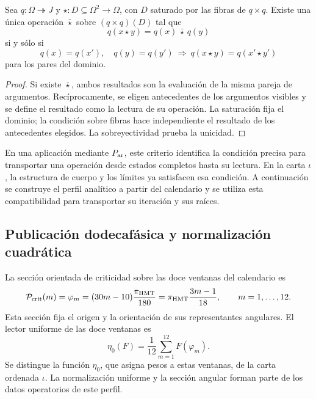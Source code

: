 \begin{proposition}
\label{hmtfg:criterio-descenso}
Sea \(q:\Omega\twoheadrightarrow J\) y
\(\star:D\subseteq\Omega^2\to\Omega\), con \(D\) saturado por las
fibras de \(q\times q\). Existe una única operación \(\bar\star\)
sobre \((q\times q)(D)\) tal que
\[
 q(x\star y)=q(x)\,\bar\star\,q(y)
\]
si y sólo si
\[
 q(x)=q(x'),\quad q(y)=q(y')
 \ \Longrightarrow\ q(x\star y)=q(x'\star y')
\]
para los pares del dominio.
\end{proposition}
\begin{proof}
Si existe \(\bar\star\), ambos resultados son la evaluación de la
misma pareja de argumentos. Recíprocamente, se eligen antecedentes
de los argumentos visibles y se define el resultado como la lectura
de su operación. La saturación fija el dominio; la condición sobre
fibras hace independiente el resultado de los antecedentes elegidos.
La sobreyectividad prueba la unicidad.
\end{proof}

En una aplicación mediante \(P_{\rm ar}\), este criterio identifica la
condición precisa para transportar una operación desde estados completos
hasta su lectura. En la carta \(\iota\), la estructura de cuerpo y
los límites ya satisfacen esa condición. A continuación se construye
el perfil analítico a partir del calendario y se utiliza esta
compatibilidad para transportar su iteración y sus raíces.

\subsection{Publicación dodecafásica y normalización cuadrática}
\label{hmtfg:perfil-dodecafasico}

La sección orientada de criticidad sobre las doce ventanas del calendario
es
\[
 \mathcal P_{\rm crit}(m)=\varphi_m
   =(30m-10)\frac{\pi_{\rm HMT}}{180}
   =\pi_{\rm HMT}\frac{3m-1}{18},\qquad m=1,\ldots,12.
\]
Esta sección fija el origen y la orientación de sus representantes
angulares. El lector uniforme de las doce ventanas es
\[
 \eta_0(F)=\frac1{12}\sum_{m=1}^{12}F(\varphi_m).
\]
Se distingue la función \(\eta_0\), que asigna pesos a estas ventanas,
de la carta ordenada \(\iota\). La normalización uniforme y la sección
angular forman parte de los datos operatorios de este perfil.

